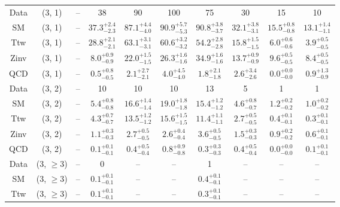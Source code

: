 \begin{table}[h!]
{\begin{tabular}{cccccccccc}
	Data & (3, 1) & -- & 38 & 90 & 100 & 75 & 30 & 15 & 10 \\[0.5ex] 
	SM & (3, 1) & -- & $37.3^{+ 2.4 }_{- 2.3 }$ & $87.1^{+ 4.4 }_{- 4.0 }$ & $90.9^{+ 5.7 }_{- 5.3 }$ & $90.8^{+ 3.8 }_{- 3.7 }$ & $32.1^{+ 3.8 }_{- 3.1 }$ & $15.5^{+ 0.8 }_{- 0.8 }$ & $13.1^{+ 1.4 }_{- 1.1 }$ \\[0.5ex] 
	Ttw & (3, 1) & -- & $28.8^{+ 2.1 }_{- 2.1 }$ & $63.1^{+ 3.1 }_{- 3.1 }$ & $60.6^{+ 3.2 }_{- 3.2 }$ & $54.2^{+ 2.8 }_{- 2.8 }$ & $15.8^{+ 1.5 }_{- 1.5 }$ & $6.0^{+ 0.6 }_{- 0.6 }$ & $3.9^{+ 0.5 }_{- 0.5 }$ \\[0.5ex] 
	Zinv & (3, 1) & -- & $8.0^{+ 0.9 }_{- 0.9 }$ & $22.0^{+ 1.5 }_{- 1.5 }$ & $26.3^{+ 1.6 }_{- 1.6 }$ & $34.9^{+ 1.6 }_{- 1.6 }$ & $13.7^{+ 0.9 }_{- 0.9 }$ & $9.6^{+ 0.5 }_{- 0.5 }$ & $8.4^{+ 0.5 }_{- 0.5 }$ \\[0.5ex] 
	QCD & (3, 1) & -- & $0.5^{+ 0.8 }_{- 0.5 }$ & $2.1^{+ 2.7 }_{- 2.1 }$ & $4.0^{+ 4.5 }_{- 4.0 }$ & $1.8^{+ 2.1 }_{- 1.8 }$ & $2.6^{+ 3.4 }_{- 2.6 }$ & $0.0^{+ 0.0 }_{- 0.0 }$ & $0.9^{+ 1.3 }_{- 0.9 }$ \\[0.5ex] 
	Data & (3, 2) & -- & 10 & 10 & 10 & 13 & 5 & 1 & 1 \\[0.5ex] 
	SM & (3, 2) & -- & $5.4^{+ 0.8 }_{- 0.8 }$ & $16.6^{+ 1.4 }_{- 1.4 }$ & $19.0^{+ 1.8 }_{- 1.8 }$ & $15.4^{+ 1.2 }_{- 1.2 }$ & $4.6^{+ 0.8 }_{- 0.7 }$ & $1.2^{+ 0.2 }_{- 0.2 }$ & $1.0^{+ 0.2 }_{- 0.2 }$ \\[0.5ex] 
	Ttw & (3, 2) & -- & $4.3^{+ 0.7 }_{- 0.7 }$ & $13.5^{+ 1.2 }_{- 1.2 }$ & $15.6^{+ 1.5 }_{- 1.5 }$ & $11.4^{+ 1.1 }_{- 1.1 }$ & $2.7^{+ 0.5 }_{- 0.5 }$ & $0.4^{+ 0.1 }_{- 0.1 }$ & $0.3^{+ 0.1 }_{- 0.1 }$ \\[0.5ex] 
	Zinv & (3, 2) & -- & $1.1^{+ 0.3 }_{- 0.3 }$ & $2.7^{+ 0.5 }_{- 0.5 }$ & $2.6^{+ 0.4 }_{- 0.4 }$ & $3.6^{+ 0.5 }_{- 0.5 }$ & $1.5^{+ 0.3 }_{- 0.3 }$ & $0.9^{+ 0.2 }_{- 0.2 }$ & $0.6^{+ 0.1 }_{- 0.1 }$ \\[0.5ex] 
	QCD & (3, 2) & -- & $0.1^{+ 0.1 }_{- 0.1 }$ & $0.4^{+ 0.5 }_{- 0.4 }$ & $0.8^{+ 0.9 }_{- 0.8 }$ & $0.3^{+ 0.3 }_{- 0.3 }$ & $0.4^{+ 0.5 }_{- 0.4 }$ & $0.0^{+ 0.0 }_{- 0.0 }$ & $0.1^{+ 0.1 }_{- 0.1 }$ \\[0.5ex] 
	Data & (3, $\ge3$) & -- & 0 & -- & -- & 1 & -- & -- & -- \\[0.5ex] 
	SM & (3, $\ge3$) & -- & $0.1^{+ 0.1 }_{- 0.1 }$ & -- & -- & $0.4^{+ 0.1 }_{- 0.1 }$ & -- & -- & -- \\[0.5ex] 
	Ttw & (3, $\ge3$) & -- & $0.1^{+ 0.1 }_{- 0.1 }$ & -- & -- & $0.3^{+ 0.1 }_{- 0.1 }$ & -- & -- & -- \\[0.5ex] 

\end{tabular}}
\end{table}

